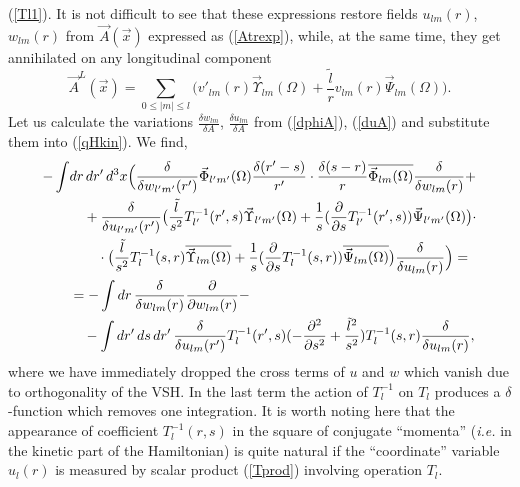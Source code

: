 \documentclass[12pt]{article}
\newcommand{\pl}{\partial}
\newcommand{\ol}{\overline}
\begin{document}
(\ref{Tl1}).
	It is not difficult to see that these expressions restore fields
$ u_{lm}(r) $,
$ w_{lm}(r) $ from
$ \vec{A}(\vec{x}) $
	expressed as 
(\ref{Atrexp}),
	while, at the same time, they get annihilated on any longitudinal component
\begin{equation*}
    \vec{A}^{L}(\vec{x}) = \sum_{0\leq |m| \leq l} \bigl(
	v'_{lm}(r)\vec{\Upsilon}_{lm}(\Omega) +\frac{\tilde{l}}{r}v_{lm}(r)
	    \vec{\Psi}_{lm}(\Omega)\bigr) .
\end{equation*}
	Let us calculate the variations
$ \frac{\delta w_{lm}}{\delta A} $,
$ \frac{\delta u_{lm}}{\delta A} $
	from
(\ref{dphiA}),
(\ref{duA}) and substitute them into
(\ref{qHkin}).
	We find,
\begin{align*}
    -\int& dr\, dr'\, d^{3}x \Bigl(\frac{\delta}{\delta w_{l'm'}(r')}
\vec{\Phi}_{l'm'}(\Omega) \frac{\delta(r'-s)}{r'} \cdot
	\frac{\delta(s-r)}{r} \ol{\vec{\Phi}_{lm}(\Omega)}
	    \frac{\delta}{\delta w_{lm}(r)}
    +\\
&\quad +\frac{\delta}{\delta u_{l'm'}(r')}
    \bigl(\frac{\tilde{l}}{s^{2}} T_{l'}^{-1}(r',s)
	\vec{\Upsilon}_{l'm'}(\Omega)
    +\frac{1}{s}(\frac{\pl}{\pl s}T_{l'}^{-1}(r',s))\vec{\Psi}_{l'm'}(\Omega)
	\bigr)\cdot \\
&\quad\quad \cdot \bigl(\frac{\tilde{l}}{s^{2}}T_{l}^{-1}(s,r)
    \ol{\vec{\Upsilon}_{lm}(\Omega)} +\frac{1}{s}(\frac{\pl}{\pl s}
    T_{l}^{-1}(s,r))\ol{\vec{\Psi}_{lm}(\Omega)} \bigr)
	\frac{\delta}{\delta u_{lm}(r)} \Bigr) =\\
&= -\int dr\, \frac{\delta}{\delta w_{lm}(r)} \frac{\pl}{\pl w_{lm}(r)} -\\
&\quad    -\int dr'\, ds\, dr'\, \frac{\delta}{\delta u_{lm}(r')}
    T_{l}^{-1}(r',s)
    (-\frac{\pl^{2}}{\pl s^{2}}+\frac{\tilde{l}^{2}}{s^{2}})
    T_{l}^{-1}(s,r) \frac{\delta}{\delta u_{lm}(r)} ,
\end{align*}
	where we have immediately dropped the cross terms of
$ u $ and
$ w $
	which vanish due to orthogonality of the VSH.
	In the last term the action of
$ T_{l}^{-1} $ on
$ T_{l} $
	produces a
$ \delta $-function
	which removes one integration.
	It is worth noting here that the appearance of coefficient
$ T_{l}^{-1}(r,s) $
	in the square of conjugate ``momenta''
	({\it i.e.} in the kinetic part of the Hamiltonian) is quite natural
	if the ``coordinate'' variable 
$ u_{l}(r) $
	is measured by scalar product
(\ref{Tprod})
	involving operation
$ T_{l} $.
\end{document}
